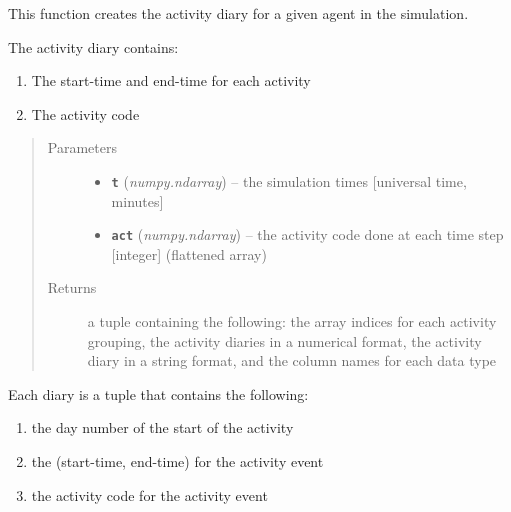 \documentclass[letterpaper,10pt,english]{sphinxmanual}
\begin{document}
\begin{fulllineitems}
\begin{quote}
\begin{description}
\end{description}\end{quote}

\begin{fulllineitems}
\label{diary:diary.Diary.create_activity_diary}
This function creates the activity diary for a given agent in the simulation.

The activity diary contains:
\begin{enumerate}
\item {} 
The start-time and end-time for each activity

\item {} 
The activity code

\end{enumerate}
\begin{quote}\begin{description}
\item[{Parameters}] \leavevmode\begin{itemize}
\item {} 
\textbf{\texttt{t}} (\emph{numpy.ndarray}) -- the simulation times {[}universal time, minutes{]}

\item {} 
\textbf{\texttt{act}} (\emph{numpy.ndarray}) -- the activity code done at each time step {[}integer{]} (flattened array)

\end{itemize}

\item[{Returns}] \leavevmode
a tuple containing the following: the array indices for each activity grouping, the activity diaries         in a numerical format, the activity diary in a string format, and the column names for each data type

\end{description}\end{quote}

Each diary is a tuple that contains the following:
\begin{enumerate}
\item {} 
the day number of the start of the activity

\item {} 
the (start-time, end-time) for the activity event

\item {} 
the activity code for the activity event


\end{enumerate}
\end{fulllineitems}
\end{fulllineitems}
\end{document}
